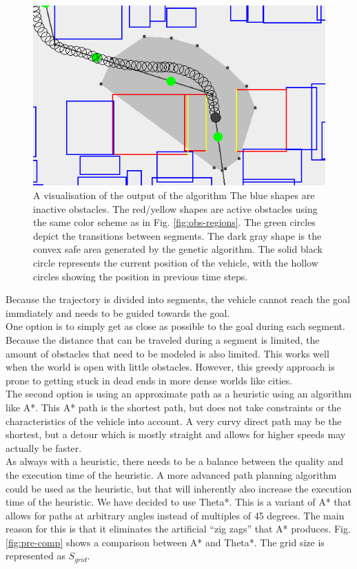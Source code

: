 \begin{figure}[!t]
    \centering
        \includegraphics[width=0.8\columnwidth]{img/pre-full}
    \caption{A visualisation of the output of the algorithm The blue shapes are inactive obstacles. The red/yellow shapes are active obstacles using the same color scheme as in Fig. \ref{fig:obs-regions}. The green circles depict the transitions between segments. The dark gray shape is the convex safe area generated by the genetic algorithm. The solid black circle represents the current position of the vehicle, with the hollow circles showing the position in previous time steps.}\label{fig:pre-full}
\end{figure}
Because the trajectory is divided into segments, the vehicle cannot reach the goal immdiately and needs to be guided towards the goal.\\
One option is to simply get as close as possible to the goal during each segment. Because the distance that can be traveled during a segment is limited, the amount of obstacles that need to be modeled is also limited. This works well when the world is open with little obstacles. However, this greedy approach is prone to getting stuck in dead ends in more dense worlds like cities.\\
The second option is using an approximate path as a heuristic using an algorithm like A*. This A* path is the shortest path, but does not take constraints or the characteristics of the vehicle into account. A very curvy direct path may be the shortest, but a detour which is mostly straight and allows for higher speeds may actually be faster. \\
As always with a heuristic, there needs to be a balance between the quality and the execution time of the heuristic. A more advanced path planning algorithm could be used as the heuristic, but that will inherently also increase the execution time of the heuristic. We have decided to use Theta*\cite{Daniel2010}. This is a variant  of A* that allows for paths at arbitrary angles instead of multiples of 45 degrees. The main reason for this is that it eliminates the artificial ``zig zags'' that A* produces. Fig. \ref{fig:pre-comp} shows a comparison between A* and Theta*. The grid size is represented as $S_{grid}$.
